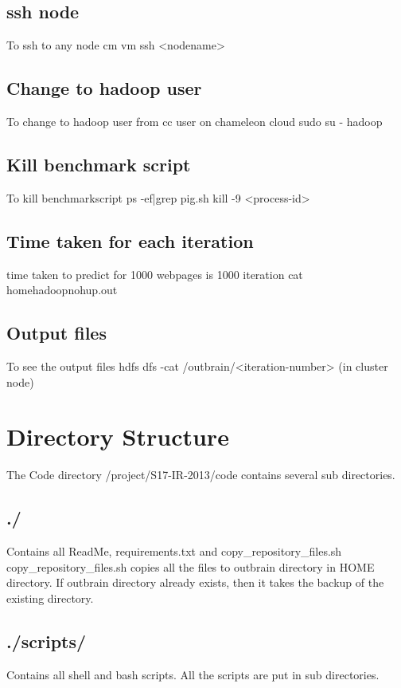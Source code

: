 \documentclass[9pt,twocolumn,twoside]{../../styles/osajnl}
\begin{document}
\subsection{ssh node} To ssh to any node
\newline cm vm ssh <nodename>
\subsection{Change to hadoop user} To change to hadoop user from cc user on chameleon cloud
\newline sudo su - hadoop
\subsection{Kill benchmark script} To kill benchmarkscript
\newline ps -ef|grep pig.sh
\newline kill -9 <process-id> 
\subsection{Time taken for each iteration} time taken to predict for 1000 webpages is 1000 iteration
\newline cat \/home\/hadoop\/nohup.out
\subsection{Output files} To see the output files
\newline hdfs dfs -cat /outbrain/<iteration-number> (in cluster node)
\section{Directory Structure}
The Code directory /project/S17-IR-2013/code contains several sub directories. 
\subsection{./} Contains all ReadMe, requirements.txt and copy\_repository\_files.sh
\newline copy\_repository\_files.sh copies all the files to outbrain directory in HOME directory. If outbrain directory already exists, then it takes the backup of the existing directory.
\subsection{./scripts/} Contains all shell and bash scripts. All the scripts are put in sub directories.
\end{document}
